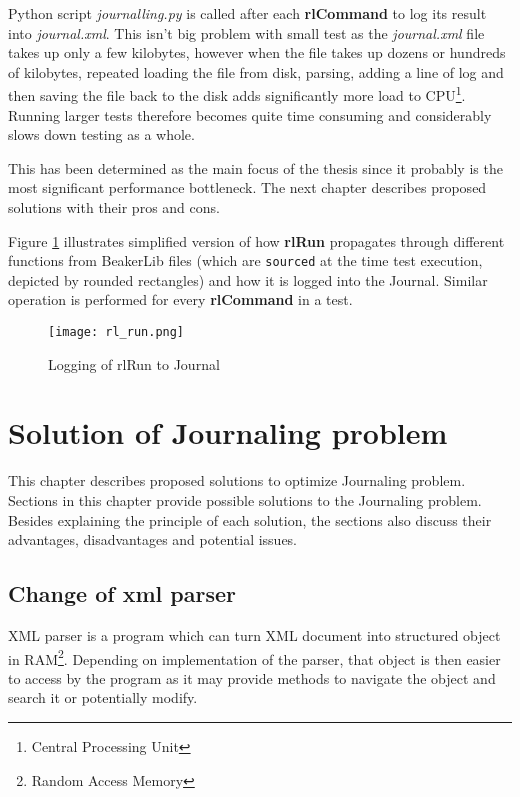 Python script \textit{journalling.py} is called after each \textbf{rlCommand} to log its result into \textit{journal.xml}. This isn't big problem with small test as the \textit{journal.xml} file takes up only a few kilobytes, however when the file takes up dozens or hundreds of kilobytes, repeated loading the file from disk, parsing, adding a line of log and then saving the file back to the disk adds significantly more load to CPU\footnote{Central Processing Unit}. Running larger tests therefore becomes quite time consuming and considerably slows down testing as a whole.

This has been determined as the main focus of the thesis since it probably is the most significant performance bottleneck. The next chapter describes proposed solutions with their pros and cons.

Figure \ref{fig:rl_run} illustrates simplified version of how \textbf{rlRun} propagates through different functions from BeakerLib files (which are \texttt{sourced} at the time test execution,  depicted by rounded rectangles) and how it is logged into the Journal. Similar operation is performed for every \textbf{rlCommand} in a test.

\begin{figure}[h!]
  \texttt{[image: rl\_run.png]}
  \caption{Logging of rlRun to Journal}
  \label{fig:rl_run}
\end{figure}


\chapter{Solution of Journaling problem}
\label{solutions}

This chapter describes proposed solutions to optimize Journaling problem. Sections in this chapter provide possible solutions to the Journaling problem. Besides explaining the principle of each solution, the sections also discuss their advantages, disadvantages and potential issues.

\section{Change of xml parser}
XML parser is a program which can turn XML document into structured object in RAM\footnote{Random Access Memory}. Depending on implementation of the parser, that object is then easier to access by the program as it may provide methods to navigate the object and search it or potentially modify. 

